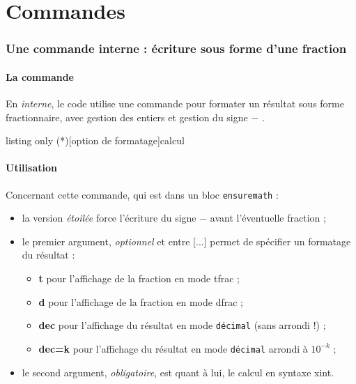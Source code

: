 \documentclass[a4paper,11pt]{article}
\newcommand\Cle[1]{{\bfseries\sffamily\textlangle #1\textrangle}}
\begin{document}
\pagebreak

\part{Commandes}

\section{Une commande interne : écriture sous forme d'une fraction}

\subsection{La commande}

\begin{cautionblock}
En \textit{interne}, le code utilise une commande pour formater un résultat sous forme fractionnaire, avec gestion des entiers et gestion du signe \og $-$ \fg.
\end{cautionblock}

\begin{PresentationCode}{listing only}
\ConvVersFrac(*)[option de formatage]{calcul}
\end{PresentationCode}

\subsection{Utilisation}

\begin{tipblock}
Concernant cette commande, qui est dans un bloc \texttt{ensuremath} :

\begin{itemize}
	\item la version \textit{étoilée} force l'écriture du signe \og $-$ \fg{} avant l'éventuelle fraction ;
	\item le premier argument, \textit{optionnel} et entre \textsf{[...]} permet de spécifier un formatage du résultat :
	\begin{itemize}
		\item \Cle{t} pour l'affichage de la fraction en mode \textsf{tfrac} ;
		\item \Cle{d} pour l'affichage de la fraction en mode \textsf{dfrac} ;
		\item \Cle{dec} pour l'affichage du résultat en mode \texttt{décimal} (sans arrondi !) ;
		\item \Cle{dec=k} pour l'affichage du résultat en mode \texttt{décimal} arrondi à $10^{-k}$ ;
	\end{itemize}
	\item le second argument, \textit{obligatoire}, est quant à lui, le calcul en syntaxe \textsf{xint}.
\end{itemize}
\end{tipblock}
\end{document}
